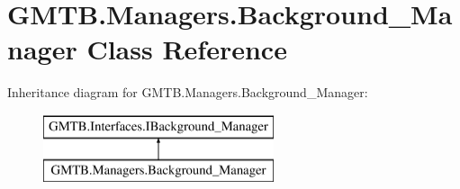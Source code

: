 \hypertarget{class_g_m_t_b_1_1_managers_1_1_background___manager}{}\section{G\+M\+T\+B.\+Managers.\+Background\+\_\+\+Manager Class Reference}
\label{class_g_m_t_b_1_1_managers_1_1_background___manager}
Inheritance diagram for G\+M\+T\+B.\+Managers.\+Background\+\_\+\+Manager\+:\begin{figure}[H]
\begin{center}
\leavevmode
\includegraphics[height=2.000000cm]{class_g_m_t_b_1_1_managers_1_1_background___manager}
\end{center}
\end{figure}
